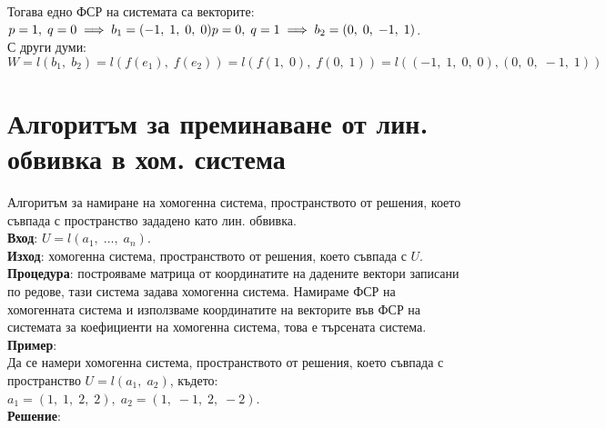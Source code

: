 \documentclass[12pt]{article}
\begin{document}
Тогава едно ФСР на системата са векторите: \\

$p = 1, \; q = 0 \implies b_1 = (-1, \; 1, \; 0, \; 0) \\
p = 0, \; q = 1 \implies b_2 = (0, \; 0, \; -1, \; 1)$. \\

С други думи: \\

$W = l(b_1, \; b_2) = l(f(e_1), \; f(e_2)) = l(f(1, \; 0), \; f(0, \; 1)) = l((-1, \; 1, \; 0, \; 0), (0, \; 0, \; -1, \; 1))$

\section*{Алгоритъм за преминаване от лин. обвивка в хом. система}

Алгоритъм за намиране на хомогенна система, пространството от решения,
което съвпада с пространство зададено като лин. обвивка. \\

\textbf{Вход}: $U = l(a_1, \; \dots, \; a_n)$. \\

\textbf{Изход}: хомогенна система, пространството от решения,
което съвпада с $U$. \\

\textbf{Процедура}: построяваме матрица от координатите на дадените вектори записани по редове,
тази система задава хомогенна система. Намираме ФСР на хомогенната система и използваме координатите
на векторите във ФСР на системата за коефициенти на хомогенна система, това е търсената система. \\

\textbf{Пример}: \\

Да се намери хомогенна система, пространството от решения,
което съвпада с пространство $U = l(a_1, \; a_2)$, където: \\

$a_1 = (1, \; 1, \; 2, \; 2), \; a_2 = (1, \; -1, \; 2, \; -2)$. \\

\textbf{Решение}: \\
\end{document}
